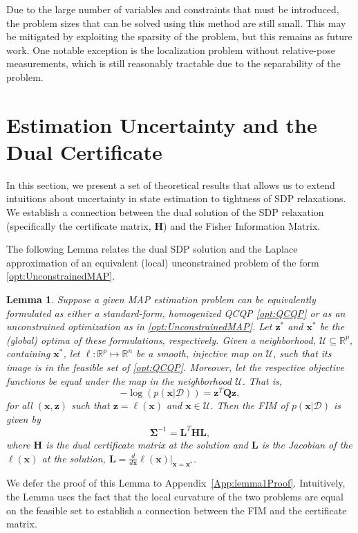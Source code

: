 \documentclass[lettersize,journal]{IEEEtran}
\newtheorem{lemma}[theorem]{Lemma}
\begin{document}
Due to the large number of variables and constraints that must be introduced, the problem sizes that can be solved using this method are still small. This may be mitigated by exploiting the sparsity of the problem, but this remains as future work. One notable exception is the localization problem without relative-pose measurements, which is still reasonably tractable due to the separability of the problem. 


\section{Estimation Uncertainty and the Dual Certificate}\label{sec:Uncertainty}

In this section, we present a set of theoretical results that allows us to extend intuitions about uncertainty in state estimation to tightness of SDP relaxations. We establish a connection between the dual solution of the SDP relaxation (specifically the certificate matrix, $\bm{H}$) and the Fisher Information Matrix. 

The following Lemma relates the dual SDP solution and the Laplace approximation of an equivalent (local) unconstrained problem of the form \eqref{opt:UnconstrainedMAP}. 

\begin{lemma}\label{thm:FisherInfo}
	Suppose a given MAP estimation problem can be equivalently formulated as either a standard-form, homogenized QCQP \eqref{opt:QCQP} or as an unconstrained optimization as in \eqref{opt:UnconstrainedMAP}. Let $\bm{z}^*$ and $\bm{x}^*$ be the (global) optima of these formulations, respectively. Given a neighborhood, $\mathcal{U} \subseteq \mathbb{R}^p$, containing $\bm{x}^*$, let $\bm{\ell}: \mathbb{R}^p \mapsto \mathbb{R}^n$ be a \emph{smooth, injective} map on $\mathcal{U}$, such that its image is in the feasible set of \eqref{opt:QCQP}. Moreover, let the respective objective functions be equal under the map in the neighborhood $\mathcal{U}$. That is,
	\begin{equation}
		-\log\left(p(\bm{x} \vert \bm{\mathcal{D}})\right) = \bm{z}^T \bm{Q} \bm{z},
	\end{equation}
	for all $(\bm{x}, \bm{z})$ such that $\bm{z}=\bm{\ell}(\bm{x})$ and $\bm{x} \in \mathcal{U}$. Then the FIM of $p(\bm{x} \vert \bm{\mathcal{D}})$ is given by
	\begin{equation}\label{eqn:FIM_H}
		\bm{\Sigma}^{-1}= \bm{L}^T \bm{H}\bm{L},
	\end{equation}
	where $\bm{H}$ is the dual certificate matrix at the solution and $\bm{L}$ is the Jacobian of the $\bm{\ell}(\bm{x})$ at the solution, $\bm{L} = \frac{d}{d\bm{x}}\bm{\ell}(\bm{x})\vert_{\bm{x}=\bm{x}^*}$. 
\end{lemma}
We defer the proof of this Lemma to Appendix~\ref{App:lemma1Proof}. Intuitively, the Lemma uses the fact that the local curvature of the two problems are equal on the feasible set to establish a connection between the FIM and the certificate matrix. 
\end{document}
